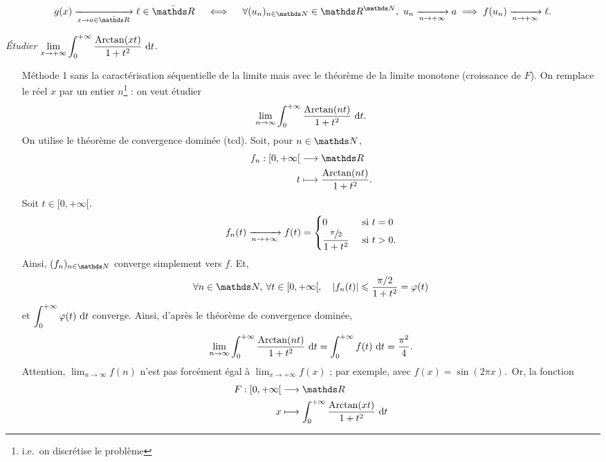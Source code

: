 \begin{met}
	\begin{rap}
		\[
			g(x) \tendsto{x\to a \in \bar{\R}} \ell \in \bar{\R}\quad\iff\quad\forall (u_n)_{n\in\N} \in \R^{\N},\ u_n \tendsto{n\to +\infty}a\implies f(u_n) \tendsto{n \to +\infty} \ell
		.\]
	\end{rap}
\end{met}

\begin{exo}
	{\slshape Étudier $\displaystyle \lim_{x\to +\infty} \int_{0}^{+\infty} \frac{\operatorname{Arctan}(xt)}{1+t^2}~\mathrm{d}t$.}

	\begin{itemize}
		\item[\sc Méthode 1] sans la caractérisation séquentielle de la limite mais avec le théorème de la limite monotone (croissance de $F$). On remplace le réel $x$\/ par un entier $n$\/\footnote{i.e.\ on discrétise le problème} : on veut étudier \[
				\lim_{n\to \infty} \int_{0}^{+\infty} \frac{\operatorname{Arctan}(nt)}{1+t^2}~\mathrm{d}t
			.\] On utilise le théorème de convergence dominée ({\sc tcd}). Soit, pour $n \in \N$, \begin{align*}
				f_n: [0,+\infty[ &\longrightarrow \R \\
				t &\longmapsto \frac{\Arctan(nt)}{1+t^2}.
			\end{align*}
			Soit $t \in [0,+\infty[$. \[
				f_n(t) \xrightarrow[n\to +\infty]{} f(t) = \begin{cases}
					0 &\text{ si } t = 0\\
					\dfrac{\sfrac{\pi}{2}}{1+t^2}&\text{ si } t > 0.
				\end{cases}
			\] Ainsi, $(f_n)_{n\in\N}$\/ converge simplement vers $f$. Et, \[
				\forall n \in \N,\:\forall t \in [0,+\infty[,\quad|f_n(t)| \le \frac{\pi / 2}{1+t^2} = \varphi(t)
			\] et $\displaystyle\int_{0}^{+\infty} \varphi(t)~\mathrm{d}t$\/ converge. Ainsi, d'après le théorème de convergence dominée, \[
				\lim_{n\to \infty} \int_{0}^{+\infty} \frac{\operatorname{Arctan}(nt)}{1+t^2}~\mathrm{d}t = \int_{0}^{+\infty} f(t)~\mathrm{d}t = \frac{\pi^2}{4}
			.\] {\color{red}Attention, $\lim_{n\to \infty} f(n)$\/ n'est pas forcément égal à $\lim_{x\to +\infty} f(x)$\/ ; par exemple, avec $f(x) = \sin(2\pi x)$.}\ Or, la fonction \begin{align*}
				F: {[0,+\infty[} &\longrightarrow \R \\
				x &\longmapsto\int_{0}^{+\infty} \frac{\Arctan(xt)}{1+t^2}~\mathrm{d}t
			\end{align*}

\end{itemize}
\end{exo}
